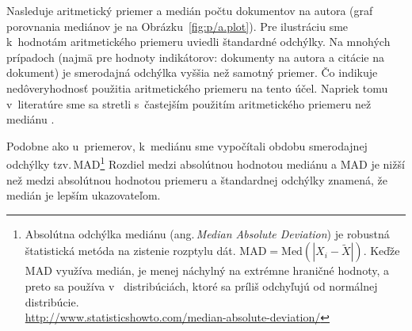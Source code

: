 Nasleduje aritmetický priemer a medián počtu dokumentov na autora (graf
porovnania mediánov je na Obrázku~\ref{fig:p/a.plot}).  Pre ilustráciu sme
k~hodnotám aritmetického priemeru uviedli štandardné odchýlky.  Na mnohých
prípadoch (najmä pre hodnoty indikátorov: dokumenty na autora a citácie na
dokument) je smerodajná odchýlka vyššia než samotný priemer.  Čo indikuje
nedôveryhodnosť použitia aritmetického priemeru na tento účel.  Napriek tomu
v~literatúre sme sa stretli s~častejším použitím aritmetického priemeru než
mediánu \citep{Lazaridis2010}.

Podobne ako u~priemerov, k~mediánu sme vypočítali obdobu smerodajnej odchýlky
tzv.\,MAD\footnote{Absolútna odchýlka mediánu (ang.\,\emph{Median Absolute
    Deviation}) je robustná štatistická metóda na zistenie rozptylu dát.
  $\mathrm{MAD} = \mathrm{Med}(|X_i - \tilde{X}|)$.  Keďže MAD využíva medián,
  je menej náchylný na extrémne hraničné hodnoty, a preto sa používa v~
  distribúciách, ktoré sa príliš odchyľujú od normálnej
  distribúcie.\\\url{http://www.statisticshowto.com/median-absolute-deviation/}}
Rozdiel medzi absolútnou hodnotou mediánu a MAD je nižší než medzi absolútnou
hodnotou priemeru a štandardnej odchýlky znamená, že medián je lepším
ukazovateľom.

